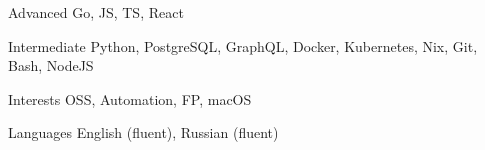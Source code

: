 
\begin{cvskills}

  \cvskill
    {Advanced}
    {Go, JS, TS, React}

    \cvskill
    {Intermediate}
    {Python, PostgreSQL, GraphQL, Docker, Kubernetes, Nix, Git, Bash, NodeJS}

   \cvskill
    {Interests}
    {OSS, Automation, FP, macOS}

  \cvskill
    {Languages}
    {English (fluent), Russian (fluent)}

\end{cvskills}
